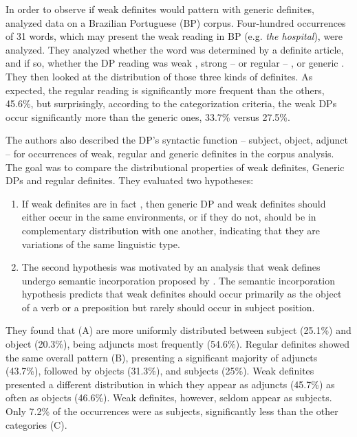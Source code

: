 \documentclass[output=paper,
modfonts
]{langscibook}
\begin{document}
In order to observe if weak definites would pattern with generic definites, \citet{deSaEtAlii2016} analyzed data on a Brazilian Portuguese (BP) corpus. Four-hundred occurrences of 31 words, which may present the weak reading in BP (e.g. \textit{the hospital}), were analyzed. They analyzed whether the word was determined by a definite article, and if so, whether the DP reading was weak \citep{CarlsonSussman2005}, strong -- or regular -- \citep{Russell1905}, or generic \citep{Carlson2006}. They then looked at the distribution of those three kinds of definites. As expected, the regular reading is significantly more frequent than the others, 45.6\%, but surprisingly, according to the categorization criteria, the weak DPs occur significantly more than the generic ones, 33.7\% versus 27.5\%.

The authors also described the DP’s syntactic function -- subject, object, adjunct -- for occurrences of weak, regular and generic definites in the corpus analysis. The goal was to compare the distributional properties of weak definites, Generic DPs and regular definites.  They evaluated two hypotheses:
\begin{enumerate}
\item If weak definites are in fact ,  then generic DP and weak definites should either occur in the same environments, or if they do not, should be in complementary distribution with one another, indicating that they are variations of the same linguistic type. \newpage
\item The second hypothesis was motivated by an analysis that weak defines undergo semantic incorporation proposed by \citet{CarlsonEtAlii2013}. The semantic incorporation hypothesis predicts that weak definites should occur primarily as the object of a verb or a preposition but rarely should occur in subject position.
\end{enumerate}


They found that  (A) are more uniformly distributed between subject (25.1\%) and object (20.3\%), being adjuncts most frequently (54.6\%). Regular definites showed the same overall pattern (B), presenting a significant majority of adjuncts (43.7\%), followed by objects (31.3\%), and subjects (25\%). Weak definites presented a different distribution in which they appear as adjuncts (45.7\%) as often as objects (46.6\%). Weak definites, however, seldom appear as subjects.  Only 7.2\% of the occurrences were as subjects, significantly less than the other categories (C).
\end{document}
